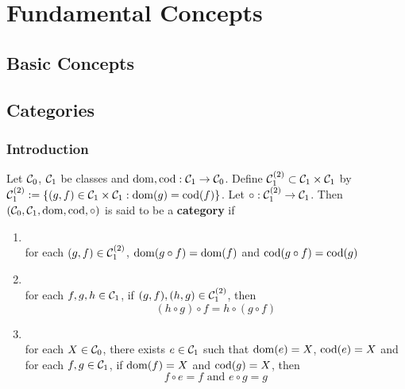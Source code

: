 \documentclass{book}
\begin{document}
	
	
	
	
	
	
	
	
	
	
	
	
	
	
	
	
	
	
	
	
	\part{Fundamental Concepts}
	
	\newpage
	\chapter{Basic Concepts}
	
	\chapter{Categories}
	
	\section{Introduction}
	
	\begin{defn} 
		Let $\mathcal{C}_0$, $\mathcal{C}_1$ be classes and $\operatorname{dom}, \operatorname{cod} : \mathcal{C}_1 \rightarrow \mathcal{C}_0$. Define $\mathcal{C}_1^{(2)}\subset \mathcal{C}_1 \times \mathcal{C}_1$ by $\mathcal{C}_1^{(2)} \vcentcolon= \{(g,f) \in \mathcal{C}_1 \times \mathcal{C}_1 : \operatorname{dom}(g) = \operatorname{cod}(f) \}$. Let $\circ: \mathcal{C}_1^{(2)} \rightarrow \mathcal{C}_1$. Then $(\mathcal{C}_0, \mathcal{C}_1, \operatorname{dom}, \operatorname{cod}, \circ)$ is said to be a \textbf{category} if 
		\begin{enumerate}
			\item {} \\ 
			for each $(g,f) \in \mathcal{C}_1^{(2)}$, $\operatorname{dom}(g \circ f) = \operatorname{dom}(f)$ and $\operatorname{cod}(g \circ f) = \operatorname{cod}(g)$
			\item {} \\ 
			for each $f,g,h \in \mathcal{C}_1$, if $(g,f), (h,g) \in \mathcal{C}_1^{(2)}$, then 
			$$(h \circ g) \circ f = h \circ (g \circ f)$$  
			\item {} \\ 
			for each $X \in \mathcal{C}_0$, there exists $e \in \mathcal{C}_1$ such that $\operatorname{dom}(e) = X$, $\operatorname{cod}(e) = X$ and for each $f, g \in \mathcal{C}_1$, if $\operatorname{dom}(f) = X$ and $\operatorname{cod}(g) = X$, then 
			$$f \circ e = f \text{ and } e \circ g = g$$ 
		\end{enumerate}
	\end{defn}
	
\end{document}
